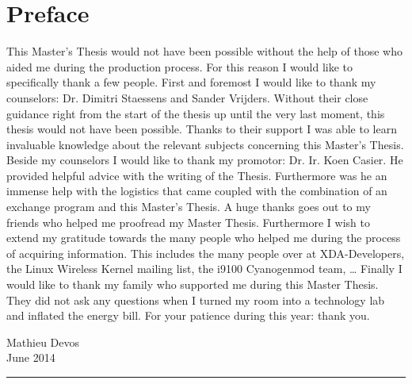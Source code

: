 \chapter*{Preface}


This Master's Thesis would not have been possible without the help of those who aided me during the production process. For this reason I would like to specifically thank a few people.
\npar
First and foremost I would like to thank my counselors: Dr. Dimitri Staessens and Sander Vrijders. Without their close guidance right from the start of the thesis up until the very last moment, this thesis would not have been possible. Thanks to their support I was able to learn invaluable knowledge about the relevant subjects concerning this Master's Thesis. 
\\
Beside my counselors I would like to thank my promotor: Dr. Ir. Koen Casier. He provided helpful advice with the writing of the Thesis. Furthermore was he an immense help with the logistics that came coupled with the combination of an exchange program and this Master's Thesis. 
\npar
A huge thanks goes out to my friends who helped me proofread my Master Thesis. Furthermore I wish to extend my gratitude towards the many people who helped me during the process of acquiring information. This includes the many people over at XDA-Developers, the Linux Wireless Kernel mailing list, the i9100 Cyanogenmod team, \ldots
\npar
Finally I would like to thank my family who supported me during this Master Thesis. They did not ask any questions when I turned my room into a technology lab and inflated the energy bill. For your patience during this year: thank you.

\vfill

\begin{flushright}
	Mathieu Devos
	\\
	June 2014 \\
	\rule{90pt}{0.4pt}
\end{flushright}
